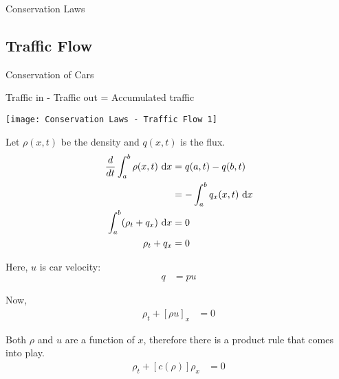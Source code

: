 \documentclass{article}
\begin{document}
{Conservation Laws}
\newpage
\subsection{Traffic Flow}
Conservation of Cars

Traffic in - Traffic out = Accumulated traffic

\begin{center}
  \texttt{[image: Conservation Laws - Traffic Flow 1]}
\end{center}

Let $\rho(x, t)$ be the density and $q(x, t)$ is the flux.
%
\begin{align}
  \frac{d}{dt} \int^b_a \rho(x, t)\ \text dx
  & = q(a, t) - q(b, t)\\
  & = -\int^b_a q_x (x, t)\ \text dx\\
  \int^b_a (\rho_t + q_x)\ \text dx & = 0\\
  \rho_t + q_x & = 0
\end{align}

Here, $u$ is car velocity:
%
\begin{align}
  q & = pu
\end{align}

Now,
%
\begin{align}
  \rho_t + [\rho u]_x & = 0
\end{align}

Both $\rho$ and $u$ are a function of $x$, therefore there is a product rule that comes into play.
%
\begin{align}
  \rho_t + [c(\rho)]\rho_x & = 0
\end{align}
\end{document}
